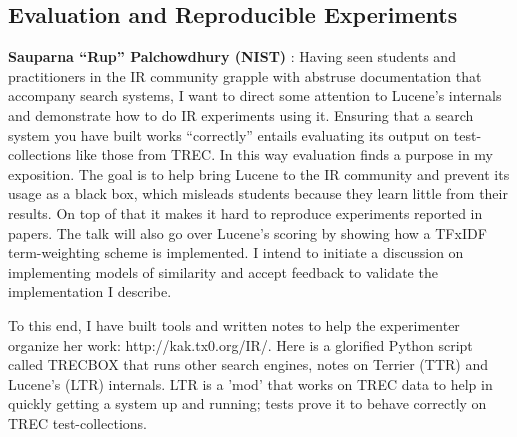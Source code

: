 \subsection*{Evaluation and Reproducible Experiments}
{\bf Sauparna ``Rup'' Palchowdhury (NIST) }:
Having seen students and practitioners in the IR community grapple with abstruse documentation that accompany search systems, I want to direct some attention to Lucene's internals and demonstrate how to do IR experiments using it. Ensuring that a search system you have built works ``correctly'' entails evaluating its output on test-collections like those from TREC. In this way evaluation finds a purpose in my exposition. The goal is to help bring Lucene to the IR community and prevent its usage as a black box, which misleads students because they learn little from their results. On top of that it makes it hard to reproduce experiments reported in papers. The talk will also go over Lucene's scoring by showing how a TFxIDF term-weighting scheme is implemented. I intend to initiate a discussion on implementing models of similarity and accept feedback to validate the implementation I describe.

To this end, I have built tools and written notes to help the experimenter organize her work: http://kak.tx0.org/IR/. Here is a
glorified Python script called TRECBOX that runs other search engines, notes on Terrier (TTR) and Lucene's (LTR) internals. LTR is a 'mod' that works on TREC data to help in quickly getting a system up and running; tests prove it to behave correctly on TREC test-collections.
